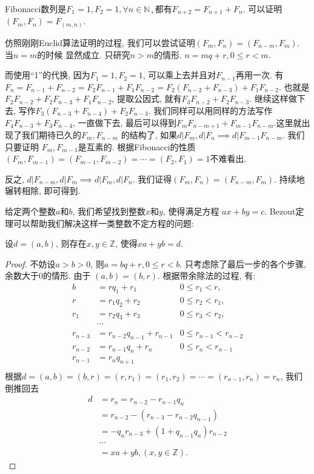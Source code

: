 \begin{example}
    Fibonacci数列是$F_1=1, F_2=1, \forall n\in \mathbb N_+$都有$F_{n+2}=F_{n+1}+F_{n}$. 
    可以证明$(F_m, F_n) = F_{(m, n)}$. 

    仿照刚刚Euclid算法证明的过程, 我们可以尝试证明$(F_m, F_n) = (F_{n-m}, F_m)$. 当$n=m$的时候
    显然成立. 只研究$n>m$的情形. $n=mq+r, 0\leq r <m$. 

    而使用``1''的代换, 因为$F_1=1, F_2=1$, 可以乘上去并且对$F_{n-1}$再用一次. 有
    $F_n=F_{n-1}+F_{n-2}=F_2F_{n-1}+F_1F_{n-2}=F_2(F_{n-2}+F_{n-3})+F_1F_{n-2}$. 也就是
    $F_2F_{n-2}+F_2F_{n-3}+F_1F_{n-2}$, 提取公因式, 就有$F_3F_{n-2}+F_2F_{n-3}$. 继续这样做下去, 
    写作$F_3(F_{n-3}+F_{n-4})+F_2F_{n-3}$. 我们同样可以用同样的方法写作$F_4F_{n-3}+F_3F_{n-4}$, 
    一直做下去, 最后可以得到$F_mF_{n-m+1}+F_{m-1}F_{n-m}$.这里就出现了我们期待已久的$F_m, F_{n-m}$
    的结构了, 如果$d|F_m, d|F_n\implies d|F_{m-1}F_{n-m}$. 我们只要证明
    $F_m, F_{m-1}$是互素的. 根据Fibonacci的性质$(F_m, F_{m-1})=(F_{m-1}, F_{m-2})=\cdots=(F_2,
     F_1)=1$不难看出. 

    反之, $d|F_{n-m}, d|F_m \implies d|F_m, d|F_n$. 我们证得$(F_m, F_n) = (F_{n-m}, F_m)$. 
    持续地辗转相除, 即可得到. 
\end{example}

 给定两个整数$a$和$b$, 我们希望找到整数$x$和$y$, 使得满足方程 $ax + by = c$. Bezout定理可以帮助我们解决这样一类整数不定方程的问题: 

\begin{theorem}
    设$d=(a, b)$, 则存在$x,y\in\mathbb Z$, 使得$xa+yb=d$. 
\end{theorem}

\begin{proof}
    不妨设$a>b>0$, 则$a=bq+r, 0\leq r<b$. 只考虑除了最后一步的各个步骤, 余数大于0的情形. 由于
    $(a, b)=(b, r)$. 根据带余除法的过程, 有: 
    \begin{align*}
        b&=rq_1+r_1 &  0\leq r_1 < r,   \\
        r&=r_1q_2+r_2 &  0\leq r_2 < r_1,   \\
        r_1&=r_2q_3+r_3 &  0\leq r_3 < r_2,   \\
        &\cdots\\
        r_{n-3}&= r_{n-2}q_{n-1}+r_{n-1} & 0\leq r_{n-1}<r_{n-2}\\
        r_{n-2}&= r_{n-1}q_n+r_n & 0\leq r_n<r_{n-1}\\
        r_{n-1}&=r_nq_{n+1}   \\
    \end{align*}
    根据$d=(a, b)=(b,r)=(r, r_1)=(r_1, r_2)=\cdots=(r_{n-1}, r_n)=r_n$, 我们倒推回去
    \begin{align*}
    d&=r_n=r_{n-2}-r_{n-1}q_n \\
    &= r_{n-2}-(r_{n-3}-r_{n-2}q_{n-1}) \\
    &= -q_n r_{n-3}+(1+q_{n-1}q_n)r_{n-2} \\ 
    &\cdots \\
    &= xa+yb, (x, y\in \mathbb Z).
    \end{align*}
\end{proof}

